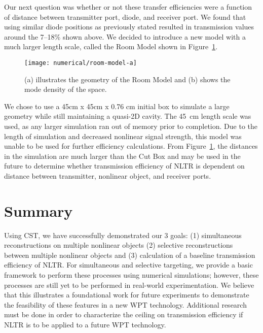 Our next question was whether or not these transfer efficiencies were a function of distance between transmitter port, diode, and receiver port. We found that using similar diode positions as previously stated resulted in transmission values around the \numrange{7}{18}\% shown above. We decided to introduce a new model with a much larger length scale, called the Room Model shown in Figure~\ref{fig:numerical-room-model}.

\begin{figure}[t]
\centering
\texttt{[image: numerical/room-model-a]}
\caption[The Room Model]{(a) illustrates the geometry of the Room Model and (b)
shows the mode density of the space.}
\label{fig:numerical-room-model}
\end{figure}


We chose to use a 45cm x 45cm x 0.76 cm initial box to simulate a large geometry while still maintaining a quasi-2D cavity. The 45~cm length scale was used, as any larger simulation ran out of memory prior to completion.  Due to the length of simulation and decreased nonlinear signal strength, this model was unable to be used for further efficiency calculations. From Figure~\ref{fig:numerical-room-model}, the distances in the simulation are much larger than the Cut Box and may be used in the future to determine whether transmission efficiency of NLTR is dependent on distance between transmitter, nonlinear object, and receiver ports.

\section{Summary}
\label{sec:numerical-conclusion}

Using CST, we have successfully demonstrated our 3 goals: (1) simultaneous reconstructions on multiple nonlinear objects (2) selective reconstructions between multiple nonlinear objects and (3) calculation of a baseline transmission efficiency of NLTR. For simultaneous and selective targeting, we provide a basic framework to perform these processes using numerical simulations; however, these processes are still yet to be performed in real-world experimentation. We believe that this illustrates a foundational work for future experiments to demonstrate the feasibility of these features in a new WPT technology. Additional research must be done in order to characterize the ceiling on transmission efficiency if NLTR is to be applied to a future WPT technology.
